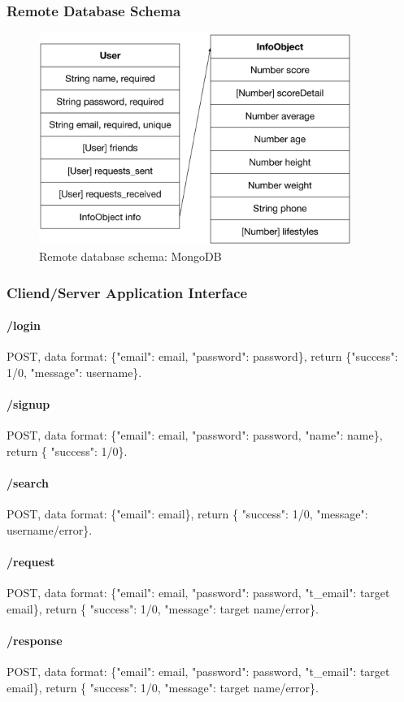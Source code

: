\subsubsection{Remote Database Schema}
\begin{figure}[H]
\centering
\includegraphics[width=4in]{img/remote_schema.eps}
\caption{Remote database schema: MongoDB}
\end{figure}

\subsubsection{Cliend/Server Application Interface}
\paragraph{/login} POST, data format: \{"email": email, "password": password\}, return \{"success": 1/0, "message": username\}.
\paragraph{/signup} POST, data format: \{"email": email, "password": password, "name": name\}, return \{ "success": 1/0\}.
\paragraph{/search} POST, data format: \{"email": email\}, return \{ "success": 1/0, "message": username/error\}.
\paragraph{/request} POST, data format: \{"email": email, "password": password, "t\_email": target email\}, return \{ "success": 1/0, "message": target name/error\}.
\paragraph{/response} POST, data format: \{"email": email, "password": password, "t\_email": target email\}, return \{ "success": 1/0, "message": target name/error\}.
